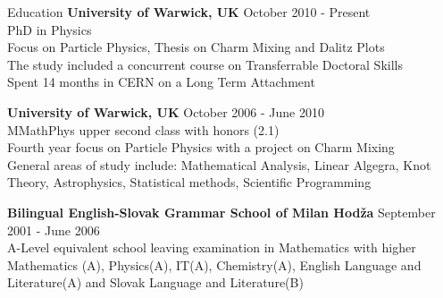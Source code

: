\documentclass{format/resume} %
\begin{document}

\begin{rSection}{Education}
{\bf University of Warwick, UK} \hfill {October 2010 - Present} \\
PhD in Physics\\
Focus on Particle Physics, Thesis on Charm Mixing and Dalitz Plots\\
The study included a concurrent course on Transferrable Doctoral Skills \\
Spent 14 months in CERN on a Long Term Attachment

{\bf University of Warwick, UK} \hfill {October 2006 - June 2010} \\
MMathPhys upper second class with honors (2.1)\\
Fourth year focus on Particle Physics with a project on Charm Mixing\\
General areas of study include: Mathematical Analysis, Linear Algegra,
Knot Theory, Astrophysics, Statistical methods, Scientific Programming

{\bf Bilingual English-Slovak Grammar School of Milan Hod\v{z}a}
\hfill {September 2001 - June 2006} \\
A-Level equivalent school leaving examination in Mathematics with
higher Mathematics (A), Physics(A), IT(A), Chemistry(A), English
Language and Literature(A) and Slovak Language and Literature(B)
\end{rSection}

\end{document}
